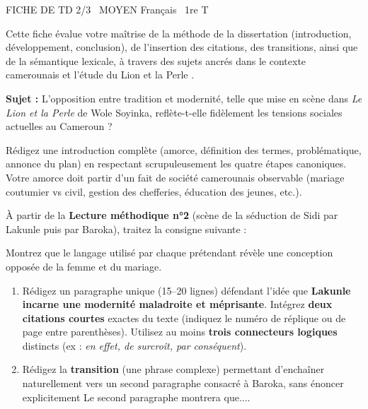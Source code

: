\documentclass[11pt]{article}
\begin{document}
\begin{tcolorbox}[enhanced,colback=popink,colframe=popink,arc=10pt,boxrule=0pt,left=12pt,right=12pt,top=9pt,bottom=9pt]
{\color{white}\popxbold\small FICHE DE TD 2/3 \textbullet\ MOYEN \hfill Français \textbullet\ 1re T\par}
\end{tcolorbox}
\vspace{4pt}
\noindent Cette fiche évalue votre maîtrise de la méthode de la dissertation (introduction, développement, conclusion), de l'insertion des citations, des transitions, ainsi que de la sémantique lexicale, à travers des sujets ancrés dans le contexte camerounais et l'étude du \og Lion et la Perle \fg{}.

\begin{exercice}
\textbf{Sujet :} \og L'opposition entre tradition et modernité, telle que mise en scène dans \textit{Le Lion et la Perle} de Wole Soyinka, reflète-t-elle fidèlement les tensions sociales actuelles au Cameroun ? \fg{}

Rédigez une introduction complète (amorce, définition des termes, problématique, annonce du plan) en respectant scrupuleusement les quatre étapes canoniques. Votre amorce doit partir d'un fait de société camerounais observable (mariage coutumier vs civil, gestion des chefferies, éducation des jeunes, etc.).
\end{exercice}

\begin{exercice}
À partir de la \textbf{Lecture méthodique n°2} (scène de la séduction de Sidi par Lakunle puis par Baroka), traitez la consigne suivante :

\og Montrez que le langage utilisé par chaque prétendant révèle une conception opposée de la femme et du mariage. \fg{}

\begin{enumerate}
    \item Rédigez un paragraphe unique (15--20 lignes) défendant l'idée que \textbf{Lakunle incarne une modernité maladroite et méprisante}. Intégrez \textbf{deux citations courtes} exactes du texte (indiquez le numéro de réplique ou de page entre parenthèses). Utilisez au moins \textbf{trois connecteurs logiques} distincts (ex : \textit{en effet, de surcroît, par conséquent}).
    \item Rédigez la \textbf{transition} (une phrase complexe) permettant d'enchaîner naturellement vers un second paragraphe consacré à Baroka, sans énoncer explicitement \og Le second paragraphe montrera que...\fg{}.
\end{enumerate}
\end{exercice}
\end{document}
